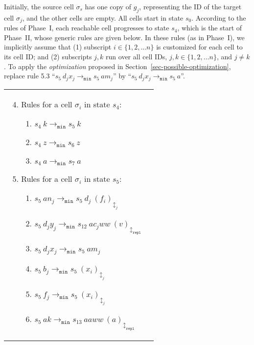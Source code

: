 \documentclass[preliminary,copyright,creativecommons]{eptcs}
\theoremstyle{remark}
\newcommand{\modmin}{\mathtt{min}}
\newcommand{\modrepl}{\mathtt{repl}}
\begin{document}
Initially, the source cell $\sigma_s$ has one copy of $g_j$, 
representing the ID of the target cell $\sigma_j$,
and the other cells are empty.
All cells start in state $s_0$.
According to the rules of Phase~I, 
each reachable cell progresses to state $s_4$,
which is the start of Phase~II, whose generic rules are given below.
In these rules (as in Phase~I), we implicitly assume that
(1) subscript $i \in \{1,2,\dots n\}$ is customized for each cell to its cell ID;
and (2) subscripts $j, k$ run over all cell IDs, $j, k \in \{1,2,\dots n\}$,
and $j \neq k$.
To apply the \emph{optimization} proposed in Section~\ref{sec-possible-optimization}, 
replace rule 5.3 ``$s_5~ d_j x_j \rightarrow_{\modmin} s_5~ a m_j$'' by 
``$s_5~ d_j x_j \rightarrow_{\modmin} s_5~ a$''.

\begin{tabular}[t]{ll}
  \begin{minipage}[t]{3.0in}
  \begin{enumerate}

  \setcounter{enumi}{3}
  \item Rules for a cell $\sigma_i$ in state $s_4$:
    \begin{enumerate}[1]
    \item $s_4~ k \rightarrow_{\modmin} s_5~ k$

    \item $s_4~ z \rightarrow_{\modmin} s_6~ z$

    \item $s_4~ a \rightarrow_{\modmin} s_7~ a$
    \end{enumerate}

\item Rules for a cell $\sigma_i$ in state $s_5$:
    \begin{enumerate}[1]
    \item $s_5~ a n_j \rightarrow_{\modmin} s_5~ d_j~ (f_i)_{\updownarrow_{j}}$

    \item $s_5~ d_j y_j \rightarrow_{\modmin} s_{12}~ a c_j w w~ (v)_{\updownarrow_\modrepl}$ 
    \item $s_5~ d_j x_j \rightarrow_{\modmin} s_5~ a m_j$ 

    \item $s_5~ b_j \rightarrow_{\modmin} s_5~ (x_i)_{\updownarrow_{j}}$
    \item $s_5~ f_j \rightarrow_{\modmin} s_5~ (x_i)_{\updownarrow_{j}}$ 

    \item $s_5~ a k \rightarrow_{\modmin} s_{13}~ a a w w~ (a)_{\updownarrow_{\modrepl}}$
    \end{enumerate}


\end{enumerate}
\end{minipage}
\end{tabular}
\end{document}
